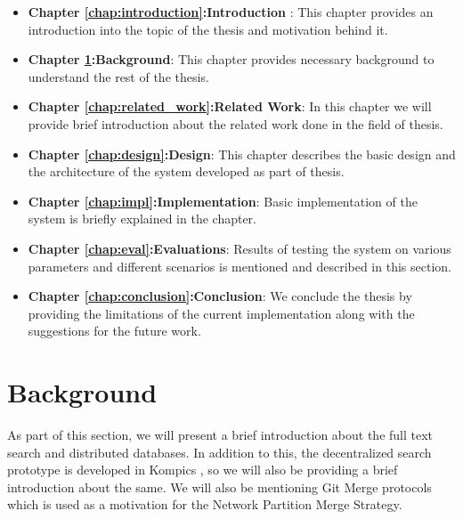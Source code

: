 \documentclass[a4paper,11pt]{kth-mag}
\begin{document}
\begin{itemize}

\item[] \textbf{Chapter \ref{chap:introduction}:Introduction} : This chapter provides an introduction into the topic of the thesis and motivation behind it.

\item[] \textbf{Chapter \ref{chap:background}:Background}: This chapter provides necessary background to understand the rest of the thesis.

\item[] \textbf{Chapter \ref{chap:related_work}:Related Work}: In this chapter we will provide brief introduction about the related work done in the field of thesis.

\item[] \textbf{Chapter \ref{chap:design}:Design}: This chapter describes the basic design and the architecture of the system developed as part of thesis.

\item[] \textbf{Chapter \ref{chap:impl}:Implementation}: Basic implementation of the system is briefly explained in the chapter.

\item[] \textbf{Chapter \ref{chap:eval}:Evaluations}: Results of testing the system on various parameters and different scenarios is mentioned and described in this section.

\item[] \textbf{Chapter \ref{chap:conclusion}:Conclusion}: We conclude the thesis by providing the limitations of the current implementation along with the suggestions for the future work.

\end{itemize}


\chapter{Background}
\label{chap:background}

As part of this section, we will present a brief introduction about the full text search and distributed databases. In addition to this, the decentralized search prototype is developed in Kompics \cite{kompics}, so we will also be providing a brief introduction about the same. We will also be mentioning Git Merge protocols which is used as a motivation for the Network Partition Merge Strategy.
\end{document}
